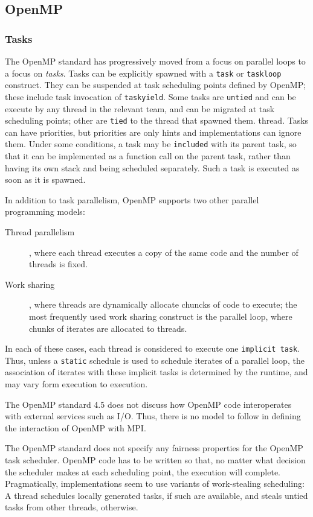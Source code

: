 \documentclass[twoside,11pt]{article}
\begin{document}
	\subsection{OpenMP}
	\subsubsection{Tasks}
	The OpenMP standard has progressively moved from a focus on parallel loops 
	to a focus on \emph{tasks}. Tasks can be explicitly spawned with a 
	\texttt{task} or \texttt{taskloop} construct. They can be suspended at task 
	scheduling points defined by OpenMP; these include task invocation of 
	\texttt{taskyield}. Some tasks are \texttt{untied} and can be execute by 
	any thread in the relevant 
	team, and can be migrated at task scheduling points; other are 
	\texttt{tied}  to the thread that spawned them.
	thread. Tasks can have priorities, but priorities are only hints and 
	implementations can ignore them. Under some conditions, a task may be 
	\texttt{included} with its parent task, so that it can be implemented as 
	a function call on the parent task, rather than having its own stack and 
	being scheduled separately. Such a task is executed as soon as it is 
	spawned. 
	
	In addition to task parallelism, OpenMP supports two other parallel 
	programming models:
	\begin{description}
		\item[Thread parallelism], where each thread executes a copy of the 
		same code and the number of threads is fixed.
		\item[Work sharing], where threads are dynamically allocate chuncks of 
		code to execute; the most frequently used work sharing construct is the 
		parallel loop, where chunks of iterates are allocated to threads. 
	\end{description}
	In each of these cases, each thread is considered to execute one 
	\texttt{implicit task}. Thus, unless a \texttt{static} schedule is used to 
	schedule iterates of a parallel loop, the association of iterates with 
	these implicit tasks is determined by the runtime, and may vary form 
	execution to execution.
	
	The OpenMP standard 4.5 does not discuss how OpenMP code interoperates 
	with external services such as I/O. Thus, there is no model to follow in 
	defining the interaction of OpenMP with MPI.  
	
	The OpenMP standard does not specify any fairness properties 
	for the OpenMP task scheduler. OpenMP code has to be 
	written so that, no matter what decision the scheduler makes at each 
	scheduling point, the execution will complete. Pragmatically, 
	implementations seem to use variants of work-stealing scheduling: A thread 
	schedules locally generated tasks, if such are available, and steals untied 
	tasks from other threads, otherwise.
	
\end{document}
